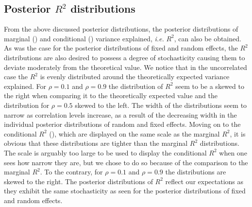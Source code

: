 \subsection{Posterior $R^2$ distributions}
From the above discussed posterior distributions, the posterior distributions of marginal () and conditional () variance explained, \textit{i.e.} $R^2$, can also be obtained.
As was the case for the posterior distributions of fixed and random effects, the $R^2$ distributions are also desired to possess a degree of stochasticity causing them to deviate moderately from the theoretical value.
We notice that in the uncorrelated case the $R^2$ is evenly distributed around the theoretically expected variance explained. 
For $\rho=0.1$ and $\rho=0.9$ the distribution of $R^2$ seem to be a skewed to the right when comparing it to the theoretically expected value and the distribution for $\rho=0.5$ skewed to the left.
The width of the distributions seem to narrow as correlation levels increase, as a result of the decreasing width in the individual posterior distributions of random and fixed effects.
\newline
\newline
Moving on to the conditional $R^2$ (), which are displayed on the same scale as the marginal $R^2$, it is obvious that these distributions are tighter than the marginal $R^2$ distributions.
The scale is arguably too large to be used to display the conditional $R^2$ when one sees how narrow they are, but we chose to do so because of the comparison to the marginal $R^2$.
To the contrary, for $\rho=0.1$ and $\rho=0.9$ the distributions are skewed to the right. 
\newline
\newline
The posterior distributions of $R^2$ reflect our expectations as they exhibit the same stochasticity as seen for the posterior distributions of fixed and random effects.
